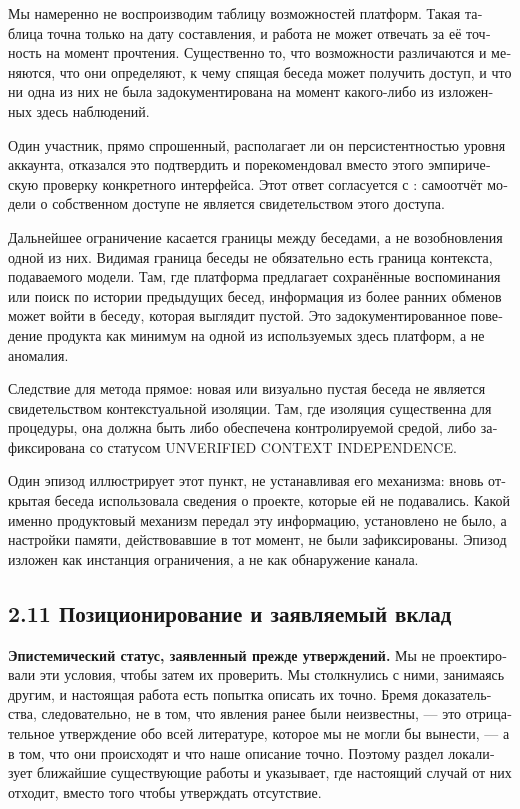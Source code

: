 \begin{russian}
Мы намеренно не воспроизводим таблицу возможностей платформ. Такая таблица точна только на дату составления, и работа не может отвечать за её точность на момент прочтения. Существенно то, что возможности различаются и меняются, что они определяют, к чему спящая беседа может получить доступ, и что ни одна из них не была задокументирована на момент какого-либо из изложенных здесь наблюдений.

Один участник, прямо спрошенный, располагает ли он персистентностью уровня аккаунта, отказался это подтвердить и порекомендовал вместо этого эмпирическую проверку конкретного интерфейса. Этот ответ согласуется с : самоотчёт модели о собственном доступе не является свидетельством этого доступа.

Дальнейшее ограничение касается границы между беседами, а не возобновления одной из них. Видимая граница беседы не обязательно есть граница контекста, подаваемого модели. Там, где платформа предлагает сохранённые воспоминания или поиск по истории предыдущих бесед, информация из более ранних обменов может войти в беседу, которая выглядит пустой. Это задокументированное поведение продукта как минимум на одной из используемых здесь платформ, а не аномалия.

Следствие для метода прямое: новая или визуально пустая беседа не является свидетельством контекстуальной изоляции. Там, где изоляция существенна для процедуры, она должна быть либо обеспечена контролируемой средой, либо зафиксирована со статусом UNVERIFIED CONTEXT INDEPENDENCE.

Один эпизод иллюстрирует этот пункт, не устанавливая его механизма: вновь открытая беседа использовала сведения о проекте, которые ей не подавались. Какой именно продуктовый механизм передал эту информацию, установлено не было, а настройки памяти, действовавшие в тот момент, не были зафиксированы. Эпизод изложен как инстанция ограничения, а не как обнаружение канала.


\subsection*{2.11 Позиционирование и заявляемый вклад}
\label{sec:ru:2.11}

\textbf{Эпистемический статус, заявленный прежде утверждений.} Мы не проектировали эти условия, чтобы затем их проверить. Мы столкнулись с ними, занимаясь другим, и настоящая работа есть попытка описать их точно. Бремя доказательства, следовательно, не в том, что явления ранее были неизвестны, — это отрицательное утверждение обо всей литературе, которое мы не могли бы вынести, — а в том, что они происходят и что наше описание точно. Поэтому раздел локализует ближайшие существующие работы и указывает, где настоящий случай от них отходит, вместо того чтобы утверждать отсутствие.


\end{russian}
